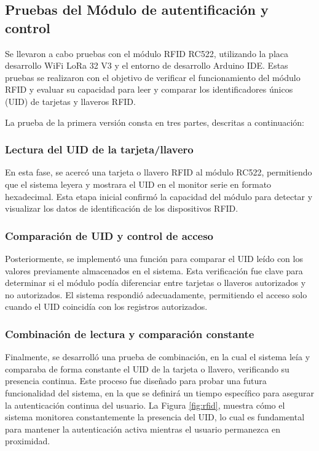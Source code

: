 \subsection{Pruebas del Módulo de autentificación y control}

Se llevaron a cabo pruebas con el módulo RFID RC522, utilizando la placa desarrollo WiFi LoRa 32 V3 y el entorno de desarrollo Arduino IDE. Estas pruebas se realizaron con el objetivo de verificar el funcionamiento del módulo RFID y evaluar su capacidad para leer y comparar los identificadores únicos (UID) de tarjetas y llaveros RFID.

La prueba de la primera versión consta en tres partes, descritas a continuación:

\subsubsection{Lectura del UID de la tarjeta/llavero}

En esta fase, se acercó una tarjeta o llavero RFID al módulo RC522, permitiendo que el sistema leyera y mostrara el UID en el monitor serie en formato hexadecimal. Esta etapa inicial confirmó la capacidad del módulo para detectar y visualizar los datos de identificación de los dispositivos RFID.

\subsubsection{Comparación de UID y control de acceso}

Posteriormente, se implementó una función para comparar el UID leído con los valores previamente almacenados en el sistema. Esta verificación fue clave para determinar si el módulo podía diferenciar entre tarjetas o llaveros autorizados y no autorizados. El sistema respondió adecuadamente, permitiendo el acceso solo cuando el UID coincidía con los registros autorizados.

\subsubsection{Combinación de lectura y comparación constante}

Finalmente, se desarrolló una prueba de combinación, en la cual el sistema leía y comparaba de forma constante el UID de la tarjeta o llavero, verificando su presencia continua. Este proceso fue diseñado para probar una futura funcionalidad del sistema, en la que se definirá un tiempo específico para asegurar la autenticación continua del usuario. La Figura \ref{fig:rfid}, muestra cómo el sistema monitorea constantemente la presencia del UID, lo cual es fundamental para mantener la autenticación activa mientras el usuario permanezca en proximidad.

